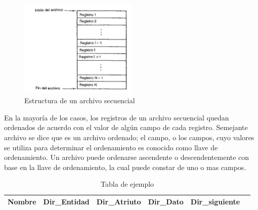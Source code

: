 \begin{figure}[!ht]
\begin{center}
  \includegraphics[width=0.5\textwidth]{secciones/imgA.png}
  \caption{Estructura de un archivo secuencial}
\end{center}
\end{figure}

En la mayoría de los casos, los registros de un archivo secuencial quedan ordenados de acuerdo con el valor de algún campo de cada registro. Semejante archivo se dice que es un archivo ordenado; el campo, o los campos, cuyo valores se utiliza para determinar el ordenamiento es conocido como llave de ordenamiento. Un archivo puede ordenarse ascendente o descendentemente con base en la llave de ordenamiento, la cual puede constar de uno o mas campos.


\begin{table}
\begin{center}

\begin{tabular}{|c|c|c|c|c|c|}
\hline
Nombre & Dir\_Entidad & Dir\_Atriuto & Dir\_Dato & Dir\_siguiente \\ 
\hline 
\end{tabular} 

\caption{Tabla de ejemplo}

\end{center}
\end{table}




